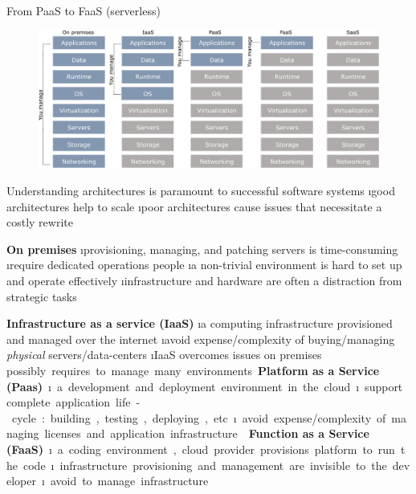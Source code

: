 \begin{frame}[allowframebreaks]{From PaaS to FaaS (serverless)}
\framebreak

\begin{figure}
    \centering
    \includegraphics[height=.6\textheight]{imgs/cloud_paastosaas.pdf}
\end{figure}

\framebreak

Understanding architectures is paramount to successful software systems
\i good architectures help to scale
\i poor architectures cause issues that necessitate a costly rewrite

\textbf{On premises}
\i provisioning, managing, and patching servers is time-consuming
\i require dedicated operations people
\i a non-trivial environment is hard to set up and operate effectively
\i infrastructure and hardware are often a distraction from strategic tasks

\framebreak

\textbf{Infrastructure as a service (IaaS)} 
\i a computing infrastructure provisioned and managed over the internet
\i avoid expense/complexity of buying/managing \textit{physical} servers/data-centers
\i IaaS overcomes issues on premises
\si possibly requires to manage many environments

\textbf{Platform as a Service (Paas)}
\i a development and deployment environment in the cloud
\i support complete application life-cycle: building, testing, deploying, etc.
\i avoid expense/complexity of managing licenses and application infrastructure

\framebreak

\textbf{Function as a Service (FaaS)}
\i a coding environment, cloud provider provisions platform to run the code
\i infrastructure provisioning and management are invisible to the developer
\i avoid to manage infrastructure


\end{frame}
